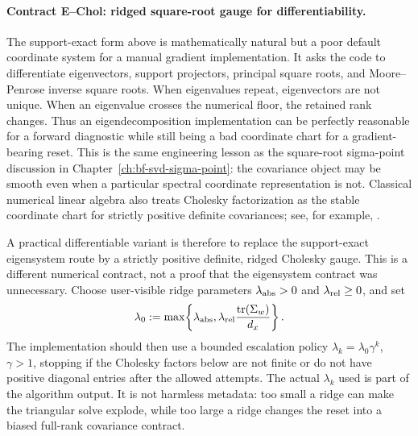 \paragraph{Contract E--Chol: ridged square-root gauge for differentiability.}
The support-exact form above is mathematically natural but a poor default
coordinate system for a manual gradient implementation.  It asks the code to
differentiate eigenvectors, support projectors, principal square roots, and
Moore--Penrose inverse square roots.  When eigenvalues repeat, eigenvectors are
not unique.  When an eigenvalue crosses the numerical floor, the retained rank
changes.  Thus an eigendecomposition implementation can be perfectly reasonable
for a forward diagnostic while still being a bad coordinate chart for a
gradient-bearing reset.  This is the same engineering lesson as the
square-root sigma-point discussion in Chapter~\ref{ch:bf-svd-sigma-point}: the
covariance object may be smooth even when a particular spectral coordinate
representation is not.  Classical numerical linear algebra also treats Cholesky
factorization as the stable coordinate chart for strictly positive definite
covariances; see, for example, \citet{higham2002accuracy}.

A practical differentiable variant is therefore to replace the support-exact
eigensystem route by a strictly positive definite, ridged Cholesky gauge.  This
is a different numerical contract, not a proof that the eigensystem contract was
unnecessary.  Choose user-visible ridge parameters
\(\lambda_{\rm abs}>0\) and \(\lambda_{\rm rel}\ge0\), and set
\begin{equation}
\label{eq:bf-eot-contract-e-chol-ridge}
  \lambda_0
  :=
  \max\!\left\{
    \lambda_{\rm abs},
    \lambda_{\rm rel}\frac{\operatorname{tr}(\Sigma_w)}{d_x}
  \right\}.
\end{equation}
The implementation should then use a bounded escalation policy
\(\lambda_k=\lambda_0\gamma^k\), \(\gamma>1\), stopping if the Cholesky factors
below are not finite or do not have positive diagonal entries after the allowed
attempts.  The actual \(\lambda_k\) used is part of the algorithm output.  It is
not harmless metadata: too small a ridge can make the triangular solve explode,
while too large a ridge changes the reset into a biased full-rank covariance
contract.

